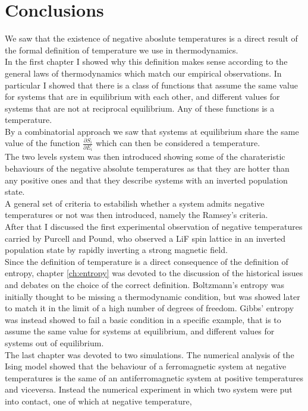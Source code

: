 \chapter{Conclusions}
We saw that the existence of negative aboslute temperatures is a direct result of the formal definition of temperature we use in thermodynamics. \\
In the first chapter I showed why this definition makes sense according to the general laws of thermodynamics which match our empirical observations. In particular I showed that there is a class of 
functions that assume the same value for systems that are in equilibrium with each other, and different values for systems that are not at reciprocal equilibrium. Any of these functions is a temperature. \\
By a combinatorial approach we saw that systems at equilibrium share the same value of the function $\frac{\partial S_i}{\partial E_i}$ which can then be considered a temperature. \\
The two levels system was then introduced showing some of the charateristic behaviours of the negative absolute temperatures as that they are hotter than any positive ones and that they describe systems with an inverted population state. \\
A general set of criteria to estabilish whether a system admits negative temperatures or not was then introduced, namely the Ramsey's criteria. \\
After that I discussed the first experimental observation of negative temperatures carried by Purcell and Pound, who observed a LiF spin lattice in an inverted population state by rapidly inverting a strong magnetic field. \\
Since the definition of temperature is a direct consequence of the definition of entropy, chapter \ref{ch:entropy} was devoted to the discussion of the historical issues and debates on the choice of the correct definition. Boltzmann's entropy was initially thought to be 
missing a thermodynamic condition, but was showed later to match it in the limit of a high number of degrees of freedom. Gibbs' entropy was instead showed to fail a basic condition in a specific example, that is to assume the same value for systems at equilibrium, and different values for systems out of equilibrium. \\
The last chapter was devoted to two simulations. The numerical analysis of the Ising model showed that the behaviour of a ferromagnetic system at negative temperatures is the same of an antiferromagnetic system at positive temperatures and viceversa. Instead the numerical experiment in which two system were put into contact, one of which at negative temperature,
